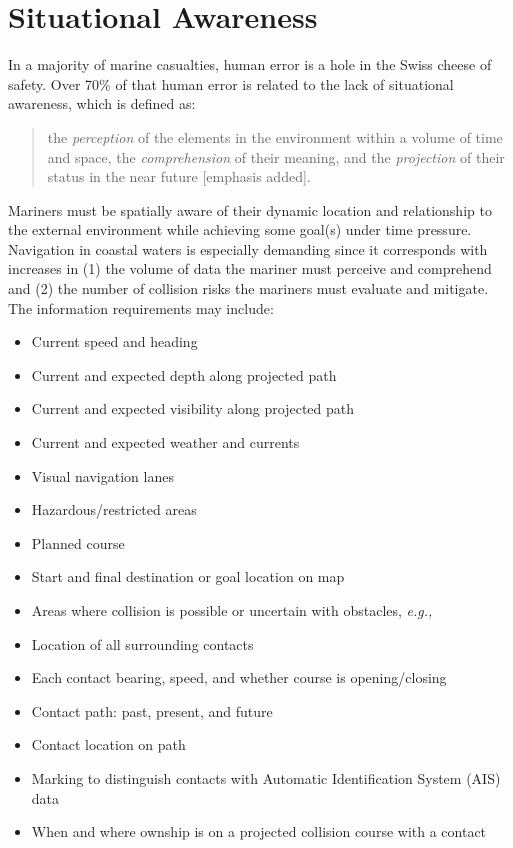 \documentclass[twoside,symmetric,notoc]{tufte-book}
\newcommand{\hairsp}{\hspace{1pt}}
\newcommand{\eg}{\textit{e.\hairsp{}g.,}\hspace{3pt}}
\begin{document}
\chapter{Situational Awareness}
\label{ch:awareness}
\par{%
In a majority of marine casualties, human error is a hole in the Swiss cheese of safety. Over 70\% of that human error is related to the lack of situational awareness,\cite{Grech} which is defined as:
\begin{quotation}
the \textit{perception} of the elements in the environment within a volume of time and space, the \textit{comprehension} of their meaning, and the \textit{projection} of their status in the near future [emphasis added].\cite{Endsley}
\end{quotation}
Mariners must be spatially aware of their dynamic location and relationship to the external environment while achieving some goal(s) under time pressure. Navigation in coastal waters is especially demanding since it corresponds with increases in (1) the volume of data the mariner must perceive and comprehend and (2) the number of collision risks the mariners must evaluate and mitigate. The information requirements may include:\cite{Cummings}
\begin{multicols}{2}
\begin{itemize}
    \item Current speed and heading
    \item Current and expected depth along projected path
    \item Current and expected visibility along projected path
    \item Current and expected weather and currents
    \item Visual navigation lanes
    \item Hazardous/restricted areas
    \item Planned course
    \item Start and final destination or goal location on map
    \item Areas where collision is possible or uncertain with obstacles, \eg{shoals, reefs}
    \item Location of all surrounding contacts
    \item Each contact bearing, speed, and whether course is opening/closing
    \item Contact path: past, present, and future
    \item Contact location on path
    \item Marking to distinguish contacts with Automatic Identification System (AIS) data
    \item When and where ownship is on a projected collision course with a contact
\end{itemize}
\end{multicols}
}
\end{document}
